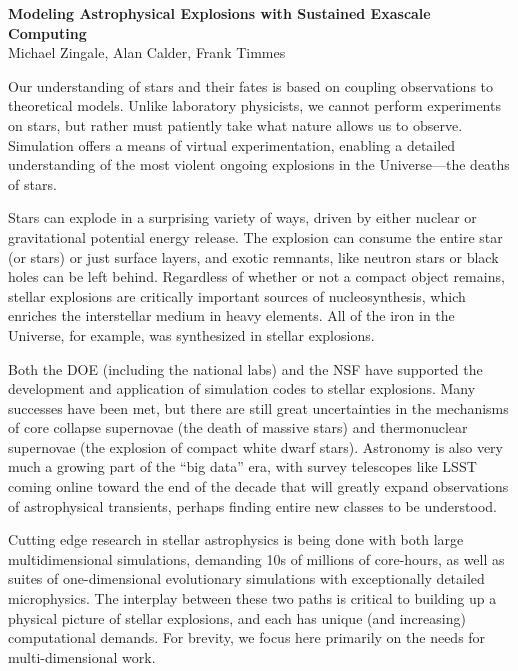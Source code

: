 \documentclass[11pt,twocolumn]{article}
\begin{document}
\begin{center}
{\sffamily \bfseries Modeling Astrophysical Explosions with Sustained Exascale Computing} \\
Michael Zingale\footnotemark[1], Alan Calder\footnotemark[1], Frank Timmes\footnotemark[2]
\end{center}
%

Our understanding of stars and their fates is based on coupling
observations to theoretical models.  Unlike laboratory physicists, we
cannot perform experiments on stars, but rather must
patiently take what nature allows us to observe.  Simulation offers a means
of virtual experimentation, enabling a detailed understanding of the
most violent ongoing explosions in the Universe---the deaths of stars.

Stars can explode in a surprising variety of ways, driven by either
nuclear or gravitational potential energy release.  The
explosion can consume the entire star (or stars) or just
surface layers, and exotic remnants, like neutron stars or black holes
can be left behind.  Regardless of whether or not a compact object
remains, stellar explosions are critically important sources of 
nucleosynthesis, which enriches the interstellar medium in heavy elements. 
All of the iron in the Universe, for example, was synthesized in 
stellar explosions.

Both the DOE (including the national labs) and the 
NSF have supported the development and application of simulation codes
to stellar explosions.  Many successes have been met, but there are
still great uncertainties in the mechanisms of core collapse
supernovae (the death of massive stars) and thermonuclear supernovae
(the explosion of compact white dwarf stars).  Astronomy is also
very much a growing part of the ``big data'' era, with survey telescopes 
like LSST coming online toward the end of the decade that will greatly 
expand observations of astrophysical transients, perhaps finding entire 
new classes to be understood.

Cutting edge research in stellar astrophysics is being done with both
large multidimensional simulations, demanding 10s of millions of
core-hours, as well as suites of one-dimensional evolutionary
simulations with exceptionally detailed microphysics.  The interplay
between these two paths is critical to building up a physical picture
of stellar explosions, and each has unique (and increasing)
computational demands.  For brevity, we focus here primarily on the 
needs for multi-dimensional work.
\end{document}

